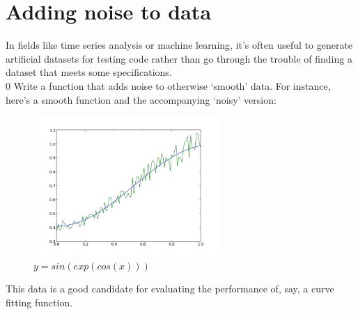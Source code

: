 \documentclass{article}
\begin{document}
\section*{Adding noise to data}
In fields like time series analysis or machine learning, it's often useful
to generate artificial datasets for testing code rather than go through the 
trouble of finding a dataset that meets some specifications. \newline \\0
Write a function that adds noise to otherwise `smooth' data. For instance, here's
a smooth function and the accompanying `noisy' version:
\begin{figure}[h]
\begin{center}
\includegraphics[height=150pt]{../pictures/noise.png}
\caption{$ y = sin(exp(cos(x))) $}
\end{center}
\end{figure}

This data is a good candidate for evaluating the performance of, say, a curve 
fitting function.
\end{document}
